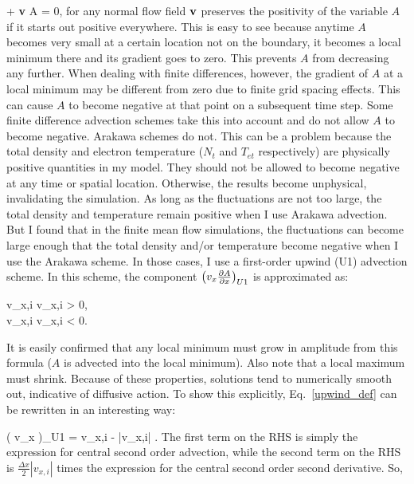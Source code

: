 \beq
\label{advec_eqn}
 + {\bf v} \cdot \grad A = 0,
\eeq
for any normal flow field ${\bf v}$ preserves the positivity of the variable $A$ if it starts out positive everywhere. This is easy to see because anytime $A$ becomes very small at a certain
location not on the boundary, it becomes a local minimum there and its gradient goes to zero. This prevents $A$ from decreasing any further. When dealing with finite differences, however,
the gradient of $A$ at a local minimum may be different from zero due to finite grid spacing effects. This can cause $A$ to become negative at that point on a subsequent time step. Some finite
difference advection schemes take this into account and do not allow $A$ to become negative. Arakawa schemes do not. This can be a problem because the total density and electron temperature
($N_t$ and $T_{et}$ respectively) are physically positive quantities in my model. They should not be allowed to become negative at any time or spatial location. Otherwise, the results
become unphysical, invalidating the simulation. As long as the fluctuations are not too large, the total density and temperature remain positive when I use Arakawa advection. But I found
that in the finite mean flow simulations, the fluctuations can become large enough that the total density and/or temperature become negative when I use the Arakawa scheme.
In those cases, I use a first-order upwind (U1) advection scheme. In this scheme, the component $\left( v_x \frac{\partial A}{\partial x} \right)_{U1}$ is approximated as:

\beqar
\label{upwind_def}
v_{x,i}   \quad v_{x,i} > 0, \nonumber \\
v_{x,i}   \quad v_{x,i} < 0.
\eeqar

It is easily confirmed that any local minimum must grow in amplitude from this formula ($A$ is advected into the local minimum). Also note that a local maximum must shrink. Because of these
properties, solutions tend to numerically smooth out, indicative of diffusive action. To show this explicitly, Eq.~\ref{upwind_def} can be rewritten in an interesting way:

\beq
\label{u1_exp}
\left( v_x  \right)_{U1} = v_{x,i}  -  |v_{x,i}| .
\eeq
The first term on the RHS is simply the expression for central second order advection, while the second term on the RHS is $\frac{\Delta x}{2} |v_{x,i}|$ times the expression for the central
second order second derivative. So,

